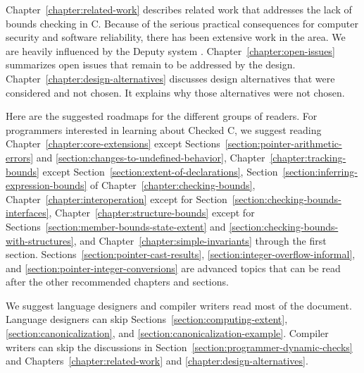 Chapter~\ref{chapter:related-work} describes related work that addresses
the lack of bounds checking in C.  Because of the serious practical consequences
for computer security and software reliability, there has been extensive work
in the area.  We are heavily influenced by the Deputy system \cite{Feng2006,Condit2007}.
Chapter~\ref{chapter:open-issues} summarizes open issues that remain to be addressed
by the design.
Chapter~\ref{chapter:design-alternatives} discusses design alternatives
that were considered and not chosen.  It explains why those alternatives were
not chosen.

Here are the suggested roadmaps for the different groups of readers.
For programmers interested in learning about Checked C, 
we suggest reading Chapter~\ref{chapter:core-extensions} except 
Sections~\ref{section:pointer-arithmetic-errors} and \ref{section:changes-to-undefined-behavior},
Chapter~\ref{chapter:tracking-bounds}
except Section~\ref{section:extent-of-declarations}, 
Section~\ref{section:inferring-expression-bounds} of Chapter~\ref{chapter:checking-bounds},
Chapter~\ref{chapter:interoperation} except for Section~\ref{section:checking-bounds-interfaces},
Chapter~\ref{chapter:structure-bounds} except for Sections~\ref{section:member-bounds-state-extent}
and \ref{section:checking-bounds-with-structures},
and Chapter~\ref{chapter:simple-invariants} through the first section.  
Sections~\ref{section:pointer-cast-results},  \ref{section:integer-overflow-informal},
and \ref{section:pointer-integer-conversions} are advanced topics that can be read
after the other recommended chapters and sections.

We suggest language designers and compiler writers 
read most of the document. Language designers can skip Sections~\ref{section:computing-extent},
\ref{section:canonicalization}, and \ref{section:canonicalization-example}.
Compiler writers can skip the discussions in Section~\ref{section:programmer-dynamic-checks}
and Chapters~\ref{chapter:related-work} and \ref{chapter:design-alternatives}.


